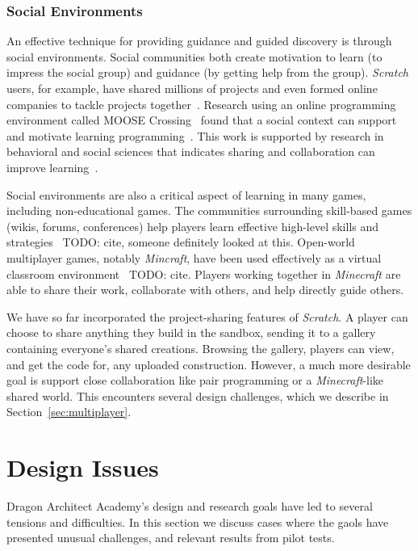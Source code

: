 \documentclass{sig-alternate}
\newcommand{\TODO}[1]{{\color{red} TODO: #1}}
\newcommand{\gametitle}{{\color{RoyalPurple} Dragon Architect Academy}}
\begin{document}
\subsubsection{Social Environments}
\label{sec:social}

An effective technique for providing guidance and guided discovery is through social environments.
Social communities both create motivation to learn (to impress the social group) and guidance (by getting help from the group).
\emph{Scratch} users, for example, have shared millions of projects and even formed online companies to tackle projects together~\cite{resnick2009scratch}. 
Research using an online programming environment called MOOSE Crossing~\cite{bruckman1997moose} found that a social context can support and motivate learning programming~\cite{bruckman2000situated}.
This work is supported by research in behavioral and social sciences that indicates sharing and collaboration can improve learning~\cite{bransford2000people}. 

Social environments are also a critical aspect of learning in many games, including non-educational games.
The communities surrounding skill-based games (wikis, forums, conferences) help players learn effective high-level skills and strategies~\TODO{cite, someone definitely looked at this}.
Open-world multiplayer games, notably \emph{Mincraft}, have been used effectively as a virtual classroom environment~\TODO{cite}.
Players working together in \emph{Minecraft} are able to share their work, collaborate with others, and help directly guide others.

We have so far incorporated the project-sharing features of \emph{Scratch}.
A player can choose to share anything they build in the sandbox, sending it to a gallery containing everyone's shared creations.
Browsing the gallery, players can view, and get the code for, any uploaded construction.
However, a much more desirable goal is support close collaboration like pair programming or a \emph{Minecraft}-like shared world.
This encounters several design challenges, which we describe in Section~\ref{sec:multiplayer}.

\section{Design Issues}
\gametitle{}'s design and research goals have led to several tensions and difficulties.
In this section we discuss cases where the gaols have presented unusual challenges, and relevant results from pilot tests.
\end{document}
